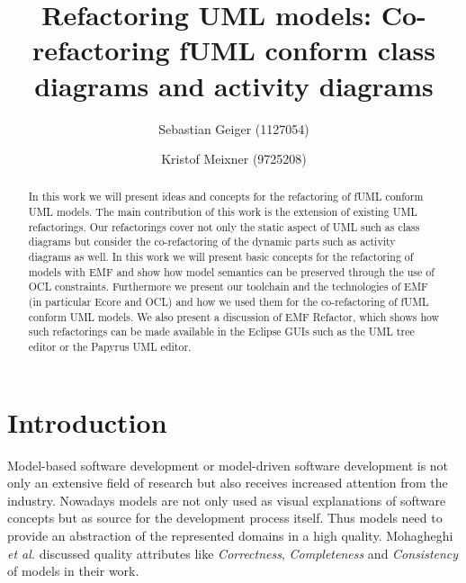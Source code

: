 \documentclass{llncs}
\begin{document}
\renewcommand{\thelstlisting}{\arabic{lstlisting}}
\pagestyle{plain}

\title{Refactoring UML models: Co-refactoring fUML conform class diagrams and activity diagrams}

\author{Sebastian Geiger (1127054) \and Kristof Meixner (9725208)}
\maketitle

\begin{abstract}
In this work we will present ideas and concepts for the refactoring of fUML conform UML models. The main contribution of this work is 
the extension of existing UML refactorings. Our refactorings cover not only the static aspect of UML such as class diagrams but consider 
the co-refactoring of the dynamic parts such as activity diagrams as well. In this work we will present basic concepts for the refactoring 
of models with EMF and show how model semantics can be preserved through the use of OCL constraints. Furthermore we present our toolchain 
and the technologies of EMF (in particular Ecore and OCL) and how we used them for the co-refactoring of fUML conform UML models. We 
also present a discussion of EMF Refactor, which shows how such refactorings can be made available in the Eclipse GUIs such as the UML 
tree editor or the Papyrus UML editor.
\end{abstract}

\tableofcontents
\newpage


\section{Introduction}

Model-based software development or model-driven software development is not only an extensive field of research but
also receives increased attention from the industry. Nowadays models are not only used as visual explanations of
software concepts but as source for the development process itself. Thus models need to provide an abstraction of
the represented domains in a high quality. Mohagheghi \textit{et al.} \cite{DBLP:journals/infsof/MohagheghiDN09} discussed 
quality attributes like \textit{Correctness}, \textit{Completeness} and \textit{Consistency} of models in their work.
\end{document}
